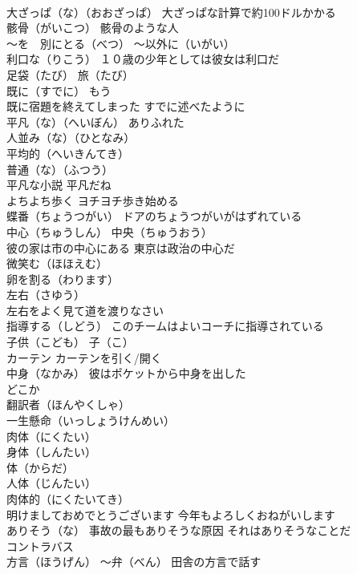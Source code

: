 \documentclass[8pt]{extreport}
\begin{document}
\begin{CJK}{UTF8}{min}
\\	大ざっぱ（な）（おおざっぱ） 大ざっぱな計算で約100ドルかかる
\\	骸骨（がいこつ） 骸骨のような人
\\	～を　別にとる（べつ） ～以外に（いがい）
\\	利口な（りこう） １０歳の少年としては彼女は利口だ
\\	足袋（たび） 旅（たび）
\\	既に（すでに） もう 
\\	既に宿題を終えてしまった すでに述べたように
\\	平凡（な）（へいぼん） ありふれた
\\	人並み（な）（ひとなみ） 
\\	平均的（へいきんてき） 
\\	普通（な）（ふつう）
\\	平凡な小説 平凡だね
\\	よちよち歩く ヨチヨチ歩き始める
\\	蝶番（ちょうつがい） ドアのちょうつがいがはずれている
\\	中心（ちゅうしん） 中央（ちゅうおう） 
\\	彼の家は市の中心にある 東京は政治の中心だ
\\	微笑む（ほほえむ）
\\	卵を割る（わります）
\\	左右（さゆう） 
\\	左右をよく見て道を渡りなさい
\\	指導する（しどう） このチームはよいコーチに指導されている
\\	子供（こども） 子（こ）
\\	カーテン カーテンを引く/開く
\\	中身（なかみ） 彼はポケットから中身を出した
\\	どこか
\\	翻訳者（ほんやくしゃ）
\\	一生懸命（いっしょうけんめい）
\\	肉体（にくたい）
\\	身体（しんたい）
\\	体（からだ）
\\	人体（じんたい）
\\	肉体的（にくたいてき）
\\	明けましておめでとうございます 今年もよろしくおねがいします
\\	ありそう（な） 事故の最もありそうな原因 それはありそうなことだ
\\	コントラバス
\\	方言（ほうげん） ～弁（べん） 田舎の方言で話す

\end{CJK}
\end{document}
